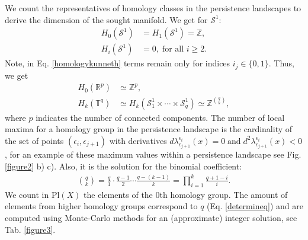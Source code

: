 \documentclass[runningheads,orivec]{llncs}
\begin{document}
We count the representatives of homology classes in the persistence landscapes to derive the dimension of the sought manifold. We get for $\mathcal{S}^1$:
\begin{align}
    H_0(\mathcal{S}^1) &= H_1(\mathcal{S}^1) = \mathbb{Z},\\
    H_i(\mathcal{S}^1) &= 0, \; \text{for all } i \geq 2.
\end{align}
Note, in Eq. \ref{homologykunneth} terms remain only for indices $i_{j} \in \{0,1\}$. Thus, we get
\begin{align}
    H_0(\mathbb{R}^p) &\simeq\mathbb{Z}^{p},\\
    \label{determineq}
    H_k(\mathbb{T}^{q}) &\simeq H_k(\mathcal{S}^{1}_{1} \times \cdots \times \mathcal{S}^{1}_{q}) \simeq \mathbb{Z}^{{q\choose{k}}},
\end{align}
where $p$ indicates the number of connected components. The number of local maxima for a homology group in the persistence landscape is the cardinality of the set of points $(\epsilon_i,\epsilon_{j+1})$ with derivatives $d\lambda^{\epsilon_i}_{\epsilon_{j+1}}(x) = 0 \; \text{and} \; d^2 \lambda^{\epsilon_i}_{\epsilon_{j+1}}(x) < 0$, for an example of these maximum values within a persistence landscape see Fig. \ref{figure2} b) c). Also, it is the solution for the binomial coefficient:
\begin{align}
     {q \choose k} = \frac{q}{1} \cdot \frac{q-1}{2} \cdots \frac{q-(k-1)}{k} = \prod_{i=1}^{k} \frac{q+1-i}{i}.
\end{align} 
We count in $\text{Pl}(X)$ the elements of the $0$th homology group. The amount of elements from higher homology groups correspond to $q$ (Eq. \ref{determineq}) and are computed using Monte-Carlo methods for an (approximate) integer solution, see Tab. \ref{figure3}.
\end{document}
